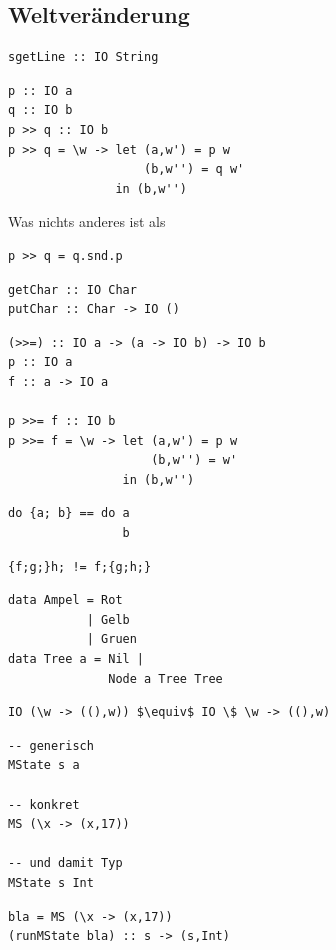 	\subsection{Weltveränderung} %
	\label{sub:weltveraenderung}
		\lstHaskell
		\begin{lstlisting}[morekeywords={sgetLine}]
sgetLine :: IO String
		\end{lstlisting}
		\lstHaskell
		\begin{lstlisting}
p :: IO a
q :: IO b
p >> q :: IO b
p >> q = \w -> let (a,w') = p w
                   (b,w'') = q w'
               in (b,w'')
		\end{lstlisting}
		Was nichts anderes ist als
		\lstHaskell
		\begin{lstlisting}
p >> q = q.snd.p
		\end{lstlisting}
		\lstHaskell
		\begin{lstlisting}
getChar :: IO Char
putChar :: Char -> IO ()
		\end{lstlisting}
		\lstHaskell
		\begin{lstlisting}
(>>=) :: IO a -> (a -> IO b) -> IO b
p :: IO a
f :: a -> IO a

p >>= f :: IO b
p >>= f = \w -> let (a,w') = p w
                    (b,w'') = w'
                in (b,w'')
		\end{lstlisting}
		\lstHaskell
		\begin{lstlisting}
do {a; b} == do a
                b
		\end{lstlisting}
		\lstHaskell
		\begin{lstlisting}
{f;g;}h; != f;{g;h;}
		\end{lstlisting}
		\lstHaskell
		\begin{lstlisting}
data Ampel = Rot
           | Gelb
           | Gruen
data Tree a = Nil |
              Node a Tree Tree
		\end{lstlisting}
		\lstHaskell
		\begin{lstlisting}[mathescape]
IO (\w -> ((),w)) $\equiv$ IO \$ \w -> ((),w)
		\end{lstlisting}


		\lstHaskell
		\begin{lstlisting}
-- generisch
MState s a

-- konkret
MS (\x -> (x,17))

-- und damit Typ
MState s Int
		\end{lstlisting}

		\lstHaskell
		\begin{lstlisting}
bla = MS (\x -> (x,17))
(runMState bla) :: s -> (s,Int)
		\end{lstlisting}

